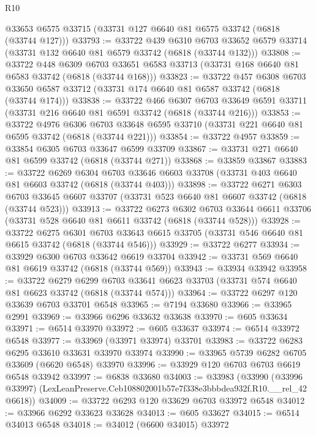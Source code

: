 \begin{lexlean}{R10}
\begin{coremodule}
    @33653
    @6575
    @33715
    (@33731 @127 @6640 @81 @6575 @33742 (@6818 (@33744 @127)))
@33793 := @33722
    @439
    @6310
    @6703
    @33652
    @6579
    @33714
    (@33731 @132 @6640 @81 @6579 @33742 (@6818 (@33744 @132)))
@33808 := @33722
    @448
    @6309
    @6703
    @33651
    @6583
    @33713
    (@33731 @168 @6640 @81 @6583 @33742 (@6818 (@33744 @168)))
@33823 := @33722
    @457
    @6308
    @6703
    @33650
    @6587
    @33712
    (@33731 @174 @6640 @81 @6587 @33742 (@6818 (@33744 @174)))
@33838 := @33722
    @466
    @6307
    @6703
    @33649
    @6591
    @33711
    (@33731 @216 @6640 @81 @6591 @33742 (@6818 (@33744 @216)))
@33853 := @33722
    @4976
    @6306
    @6703
    @33648
    @6595
    @33710
    (@33731 @221 @6640 @81 @6595 @33742 (@6818 (@33744 @221)))
@33854 := @33722 @4957
@33859 := @33854 @6305 @6703 @33647 @6599 @33709
@33867 := @33731 @271 @6640 @81 @6599 @33742 (@6818 (@33744 @271))
@33868 := @33859 @33867
@33883 := @33722
    @6269
    @6304
    @6703
    @33646
    @6603
    @33708
    (@33731 @403 @6640 @81 @6603 @33742 (@6818 (@33744 @403)))
@33898 := @33722
    @6271
    @6303
    @6703
    @33645
    @6607
    @33707
    (@33731 @523 @6640 @81 @6607 @33742 (@6818 (@33744 @523)))
@33913 := @33722
    @6273
    @6302
    @6703
    @33644
    @6611
    @33706
    (@33731 @528 @6640 @81 @6611 @33742 (@6818 (@33744 @528)))
@33928 := @33722
    @6275
    @6301
    @6703
    @33643
    @6615
    @33705
    (@33731 @546 @6640 @81 @6615 @33742 (@6818 (@33744 @546)))
@33929 := @33722 @6277
@33934 := @33929 @6300 @6703 @33642 @6619 @33704
@33942 := @33731 @569 @6640 @81 @6619 @33742 (@6818 (@33744 @569))
@33943 := @33934 @33942
@33958 := @33722
    @6279
    @6299
    @6703
    @33641
    @6623
    @33703
    (@33731 @574 @6640 @81 @6623 @33742 (@6818 (@33744 @574)))
@33964 := @33722 @6297 @120 @33639 @6703 @33701 @6548
@33965 := @7194 @33680
@33966 := @33965 @2991
@33969 := @33966 @6296 @33632 @33638
@33970 := @605 @33634
@33971 := @6514 @33970
@33972 := @605 @33637
@33974 := @6514 @33972 @6548
@33977 := @33969 (@33971 @33974) @33701
@33983 := @33722 @6283 @6295 @33610 @33631 @33970 @33974
@33990 := @33965 @5739 @6282 @6705 @33609 (@6620 @6548) @33970
@33996 := @33929 @120 @6703 @6703 @6619 @6548 @33942
@33997 := @6838 @33680
@34003 := @33983
    (@33990 (@33996 @33997) (LexLeanPreserve.Ceb108802001b57e7f338e3bbbdea932f.R10.__rel_42 @6618))
@34009 := @33722 @6293 @120 @33629 @6703 @33972 @6548
@34012 := @33966 @6292 @33623 @33628
@34013 := @605 @33627
@34015 := @6514 @34013 @6548
@34018 := @34012 (@6600 @34015) @33972

\end{coremodule}
\end{lexlean}
